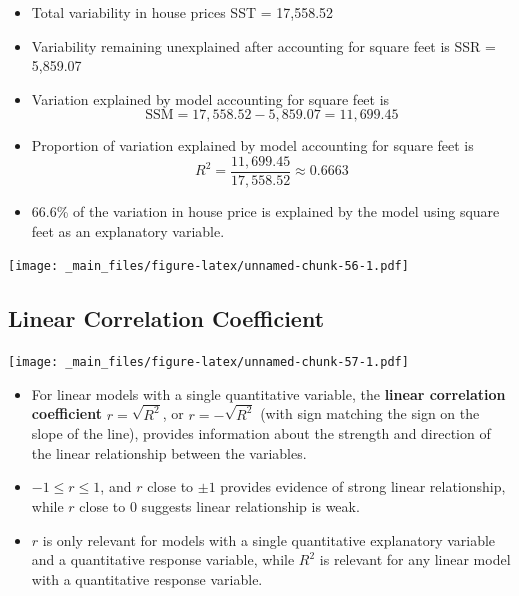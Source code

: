\documentclass[]{book}
\newenvironment{Shaded}{\begin{snugshade}}{\end{snugshade}}
\newcommand{\KeywordTok}[1]{\textcolor[rgb]{0.13,0.29,0.53}{\textbf{#1}}}
\newcommand{\OperatorTok}[1]{\textcolor[rgb]{0.81,0.36,0.00}{\textbf{#1}}}
\newcommand{\NormalTok}[1]{#1}
\begin{document}
\begin{itemize}
\item
  Total variability in house prices SST = 17,558.52\\
\item
  Variability remaining unexplained after accounting for square feet is
  SSR = 5,859.07\\
\item
  Variation explained by model accounting for square feet is
  \[ \text{SSM} = 17,558.52 - 5,859.07 = 11,699.45 \]
\item
  Proportion of variation explained by model accounting for square feet
  is \[ R^2=\frac{11,699.45}{17,558.52}\approx0.6663\]
\item
  66.6\% of the variation in house price is explained by the model using
  square feet as an explanatory variable.
\end{itemize}

\texttt{[image: \_main\_files/figure-latex/unnamed-chunk-56-1.pdf]}

\subsection{Linear Correlation
Coefficient}\label{linear-correlation-coefficient}

\texttt{[image: \_main\_files/figure-latex/unnamed-chunk-57-1.pdf]}

\begin{itemize}
\item
  For linear models with a single quantitative variable, the
  \textbf{linear correlation coefficient} \(r=\sqrt{R^2}\), or
  \(r=-\sqrt{R^2}\) (with sign matching the sign on the slope of the
  line), provides information about the strength and direction of the
  linear relationship between the variables.
\item
  \(-1 \leq r \leq 1\), and \(r\) close to \(\pm1\) provides evidence of
  strong linear relationship, while \(r\) close to 0 suggests linear
  relationship is weak.
\item
  \(r\) is only relevant for models with a single quantitative
  explanatory variable and a quantitative response variable, while
  \(R^2\) is relevant for any linear model with a quantitative response
  variable.
\end{itemize}

\begin{Shaded}
\end{Shaded}
\end{document}
